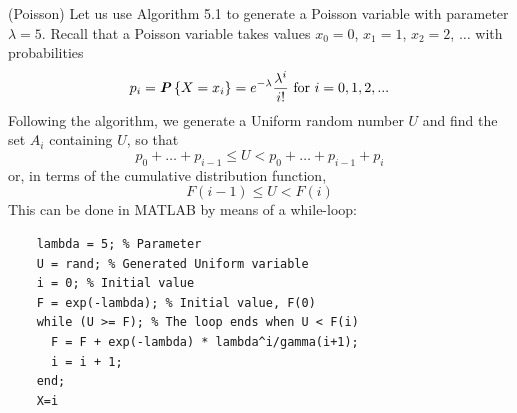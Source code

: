 \begin{example}{ (Poisson)}
  Let us use Algorithm 5.1 to generate a Poisson variable with parameter $\lambda = 5$. Recall that a Poisson variable takes values $x_0 = 0$, $x_1 = 1$, $x_2 = 2$, $\ldots$ with probabilities
  \begin{equation*}
    p_i = \textbf{\textit{P}}\left\{X = x_i\right\} = e^{-\lambda}\frac{\lambda^{i}}{i!} \textnormal{ for } i =0,1,2,...
  \end{equation*}
  Following the algorithm, we generate a Uniform random number $U$ and find the set $A_i$ containing $U$, so that
  \begin{equation*}
    p_0 + \ldots + p_{i-1} \leq U < p_0 + \ldots + p_{i-1} + p_i
  \end{equation*}
  or, in terms of the cumulative distribution function,
  \begin{equation*}
    F(i - 1) \leq U < F(i)
  \end{equation*}
  This can be done in MATLAB by means of a while-loop:
  \begin{verbatim}
    lambda = 5; % Parameter
    U = rand; % Generated Uniform variable
    i = 0; % Initial value
    F = exp(-lambda); % Initial value, F(0)
    while (U >= F); % The loop ends when U < F(i)
      F = F + exp(-lambda) * lambda^i/gamma(i+1);
      i = i + 1;
    end;
    X=i
  \end{verbatim}
\end{example}

